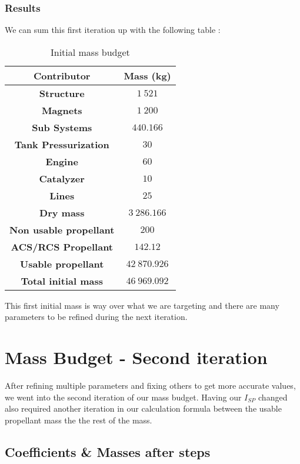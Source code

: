 \subsubsection{Results}
We can sum this first iteration up with the following table :
\begin{center}
	\begin{table}

	
\begin{tabular}[H]{|c|c|}
	\hline
	\cellcolor{gray!50}\textbf{Contributor} & \cellcolor{green!20}\textbf{Mass} (kg)\\
	\hline
	\textbf{Structure} & $1\ 521$\\
	\hline
	\textbf{Magnets} & $1\ 200$\\
	\hline
	\textbf{Sub Systems} & $440.166$\\
	\hline
	\textbf{Tank Pressurization} & $30$\\
	\hline
	\textbf{Engine} & $60$\\
	\hline
	\textbf{Catalyzer} & $10$\\
	\hline
	\textbf{Lines} & $25$\\
	\hline
	\cellcolor{gray!50}\textbf{Dry mass} & \cellcolor{green!20} $3\ 286.166$\\
	\hline
	\textbf{Non usable propellant} & $200$\\
	\hline
	\textbf{ACS/RCS Propellant} & $142. 12$\\
	\hline
	\textbf{Usable propellant} & $42\ 870.926$\\
	\cellcolor{red!50}\textbf{Total initial mass} & \cellcolor{red!50}$46\ 969.092$\\
	\hline 
\end{tabular}
\caption{Initial mass budget}
\end{table}
\end{center}
This first initial mass is way over what we are targeting and there are many parameters to be refined during the next iteration.
\newpage
\section{Mass Budget - Second iteration}
\qquad After refining multiple parameters and fixing others to get more accurate values, we went into the second iteration of our mass budget. Having our $I_{SP}$ changed also required another iteration in our calculation formula between the usable propellant mass the the rest of the mass.

\subsection{Coefficients \& Masses after steps}


